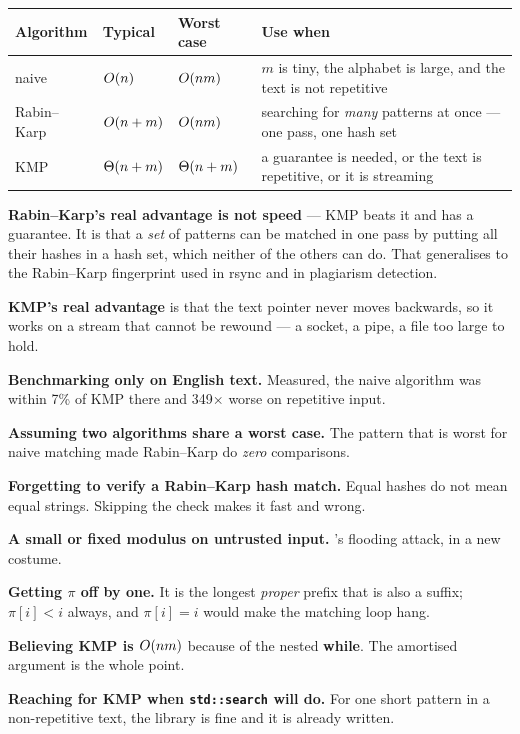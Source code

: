 \begin{conceptbox}[Choosing]
\begin{longtable}{@{}L{2.8cm}L{3.0cm}L{3.0cm}L{5.0cm}@{}}
\toprule
{}
\textbf{Algorithm} & \textbf{Typical} & \textbf{Worst case} &
\textbf{Use when} \\
\midrule
\endhead
naive & $O(n)$ & $O(nm)$ & $m$ is tiny, the alphabet is large, and the
  text is not repetitive \\
Rabin--Karp & $O(n+m)$ & $O(nm)$ & searching for \emph{many} patterns
  at once --- one pass, one hash set \\
KMP & $\Theta(n+m)$ & $\Theta(n+m)$ & a guarantee is needed, or the text is
  repetitive, or it is streaming \\
\bottomrule
\end{longtable}

\smallskip
\textbf{Rabin--Karp's real advantage is not speed} --- KMP beats it and has a
guarantee. It is that a \emph{set} of patterns can be matched in one pass by
putting all their hashes in a hash set, which neither of the others can do.
That generalises to the Rabin--Karp fingerprint used in rsync and in
plagiarism detection.

\smallskip
\textbf{KMP's real advantage} is that the text pointer never moves backwards,
so it works on a stream that cannot be rewound --- a socket, a pipe, a file too
large to hold.
\end{conceptbox}

\begin{pitfall}
\begin{tight}
  \item \textbf{Benchmarking only on English text.} Measured, the naive
        algorithm was within 7\% of KMP there and 349$\times$ worse on
        repetitive input.
  \item \textbf{Assuming two algorithms share a worst case.} The pattern that
        is worst for naive matching made Rabin--Karp do \emph{zero}
        comparisons.
  \item \textbf{Forgetting to verify a Rabin--Karp hash match.} Equal hashes do
        not mean equal strings. Skipping the check makes it fast and wrong.
  \item \textbf{A small or fixed modulus on untrusted input.} 's
        flooding attack, in a new costume.
  \item \textbf{Getting $\pi$ off by one.} It is the longest \emph{proper}
        prefix that is also a suffix; $\pi[i] < i$ always, and
        $\pi[i] = i$ would make the matching loop hang.
  \item \textbf{Believing KMP is $O(nm)$} because of the nested
        \textbf{while}. The amortised argument is the whole point.
  \item \textbf{Reaching for KMP when \texttt{std::search} will do.} For one
        short pattern in a non-repetitive text, the library is fine and it is
        already written.
\end{tight}
\end{pitfall}

